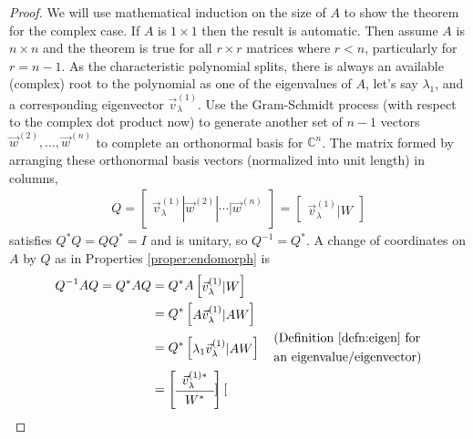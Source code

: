 \begin{proof}
We will use mathematical induction on the size of $A$ to show the theorem for the complex case. If $A$ is $1 \times 1$ then the result is automatic. Then assume $A$ is $n \times n$ and the theorem is true for all $r \times r$ matrices where $r < n$, particularly for $r = n-1$. As the characteristic polynomial splits, there is always an available (complex) root to the polynomial as one of the eigenvalues of $A$, let's say $\lambda_1$, and a corresponding eigenvector $\vec{v}_\lambda^{(1)}$. Use the Gram-Schmidt process (with respect to the complex dot product now) to generate another set of $n-1$ vectors $\vec{w}^{(2)}, \ldots, \vec{w}^{(n)}$ to complete an orthonormal basis for $\mathbb{C}^n$. The matrix formed by arranging these orthonormal basis vectors (normalized into unit length) in columns,
\begin{align*}
Q = \begin{bmatrix}
\vec{v}_\lambda^{(1)} | \vec{w}^{(2)} | \cdots | \vec{w}^{(n)}
\end{bmatrix} =
\begin{bmatrix}
\vec{v}_\lambda^{(1)} | W
\end{bmatrix}
\end{align*}
satisfies $Q^*Q = QQ^* = I$ and is unitary, so $Q^{-1} = Q^*$. A change of coordinates on $A$ by $Q$ as in Properties \ref{proper:endomorph} is
\begin{align}
Q^{-1}AQ = Q^* AQ &= Q^*A\begin{bmatrix}
\vec{v}_\lambda^{(1)} | W
\end{bmatrix} \nonumber \\
&= Q^*\begin{bmatrix}
A\vec{v}_\lambda^{(1)} | AW
\end{bmatrix} \nonumber \\
&= Q^*\begin{bmatrix}
\lambda_1\vec{v}_\lambda^{(1)} | AW
\end{bmatrix} \quad \begin{aligned}
&\text{(Definition \ref{defn:eigen} for} \\
&\text{an eigenvalue/eigenvector)}
\end{aligned} \nonumber \\
&= 
\left[\begin{array}{c}
\vec{v}_\lambda^{(1)*} \Bstrut \\
\hline
W^* \Tstrut
\end{array}\right]
\begin{bmatrix}

\end{bmatrix}
\end{align}
\end{proof}
